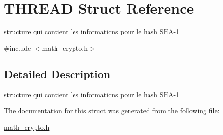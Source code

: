 \hypertarget{structTHREAD}{\section{T\-H\-R\-E\-A\-D Struct Reference}
\label{structTHREAD}
}


structure qui contient les informations pour le hash S\-H\-A-\/1  




{\ttfamily \#include $<$math\-\_\-crypto.\-h$>$}



\subsection{Detailed Description}
structure qui contient les informations pour le hash S\-H\-A-\/1 

The documentation for this struct was generated from the following file\-:\begin{DoxyCompactItemize}
\item 
\hyperlink{math__crypto_8h}{math\-\_\-crypto.\-h}\end{DoxyCompactItemize}
